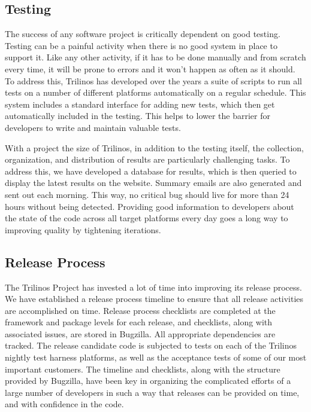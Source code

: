 \documentclass[12pt,relax]{article}
\begin{document}
\subsection{Testing}


The success of any software project is critically dependent on good testing.
Testing can be a painful activity when there is no good system in place to
support it.  Like any other activity, if it has to be done manually and from
scratch every time, it will be prone to errors and it won't happen as often as
it should.  To address this, Trilinos has developed over the years a suite of
scripts to run all tests on a number of different platforms automatically on a
regular schedule.  This system includes a standard interface for adding new
tests, which then get automatically included in the testing.  This helps
to lower the barrier for developers to write and maintain valuable tests.

With a project the size of Trilinos, in addition to the testing itself, the
collection, organization, and distribution of results are particularly
challenging tasks.  To address this, we have developed a database for results,
which is then queried to display the latest results on the website.  Summary
emails are also generated and sent out each morning.  This way, no critical bug
should live for more than 24 hours without being detected.  Providing good
information to developers about the state of the code across all target
platforms every day goes a long way to improving quality by tightening
iterations.

\subsection{Release Process}

The Trilinos Project has invested a lot of time into improving its release
process.  We have established a release process timeline to ensure that all
release activities are accomplished on time.  Release process checklists are
completed at the framework and package levels for each release, and checklists,
along with associated issues, are stored in Bugzilla.  All appropriate
dependencies are tracked.  The release candidate code is subjected to tests on
each of the Trilinos nightly test harness platforms, as well as the acceptance
tests of some of our most important customers.  The timeline and checklists,
along with the structure provided by Bugzilla, have been key in organizing the
complicated efforts of a large number of developers in such a way that releases
can be provided on time, and with confidence in the code.  
\end{document}
